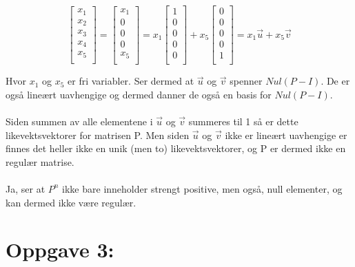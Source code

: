 \documentclass[a4paper, norsk, twoside, 10pt]{article}
\begin{document}
\begin{flushleft}
  \[ \begin{bmatrix}
    x_{1} \\
    x_{2} \\
    x_{3} \\
    x_{4} \\
    x_{5} \\
  \end{bmatrix}
  =
  \begin{bmatrix}
    x_{1} \\
    0 \\
    0 \\
    0 \\
    x_{5}\\
  \end{bmatrix}
  = x_{1}
  \begin{bmatrix}
    1 \\
    0 \\
    0 \\
    0 \\
    0 \\
  \end{bmatrix}
  + x_{5}
  \begin{bmatrix}
    0 \\
    0 \\
    0 \\
    0 \\
    1 \\
  \end{bmatrix}
  = x_{1}\vec{u} + x_{5}\vec{v}
  \]


  Hvor $x_{1}$ og $x_{5}$ er fri variabler. Ser dermed at $\vec{u}$ og $\vec{v}$ spenner $Nul(P-I)$. De er også lineært uavhengige og dermed danner de også en basis for $Nul(P-I)$.
  \ \\ \ \\
  Siden summen av alle elementene i $\vec{u}$ og $\vec{v}$ summeres til 1 så er dette likevektsvektorer for matrisen P. Men siden $\vec{u}$ og $\vec{v}$ ikke er lineært uavhengige er finnes det heller ikke en unik (men to) likevektsvektorer, og P er dermed ikke en regulær matrise.
  \ \\ \ \\
  Ja, ser at $P^{n}$ ikke bare inneholder strengt positive, men også, null elementer, og kan dermed ikke være regulær.
  \section*{Oppgave 3:}

  \begin{tikzpicture}[->,>=stealth',shorten >=1pt,auto,node distance=3cm,
      thick,main node/.style={circle,draw,font=\sffamily\Large\bfseries}]


\end{tikzpicture}
\end{flushleft}
\end{document}
